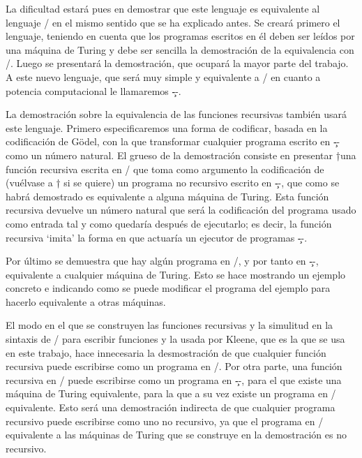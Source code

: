 La dificultad estará pues en demostrar que este lenguaje es equivalente al lenguaje \C/ en el mismo
sentido que se ha explicado antes. Se creará primero el lenguaje, teniendo en cuenta que los
programas escritos en él deben ser leídos por una máquina de Turing y debe ser sencilla la
demostración de la equivalencia con \C/. Luego se presentará la demostración, que ocupará la mayor
parte del trabajo. A este nuevo lenguaje, que será muy simple y equivalente a \C/ en cuanto a potencia
computacional le llamaremos \c--.

La demostración sobre la equivalencia de las funciones recursivas también usará este
lenguaje. Primero especificaremos una forma de codificar, basada en la codificación de Gödel, con la
que transformar cualquier programa escrito en \c-- como un número natural. El grueso de la
demostración consiste en presentar †una función recursiva escrita en \C/ que toma como
argumento la codificación de (vuélvase a † si se quiere) un programa no recursivo escrito en \c--,
que como se habrá demostrado es equivalente a alguna máquina de Turing. Esta función recursiva
devuelve un número natural que será la codificación del programa usa\-do como entrada tal y como
quedaría después de ejecutarlo; es decir, la función recursiva ‘imita’ la forma en que actuaría un
ejecutor de programas \c--.

Por último se demuestra que hay algún programa en \C/, y por tanto en \c--, equivalente a cualquier
máquina de Turing. Esto se hace mostrando un ejemplo concreto e indicando como se puede modificar el
programa del ejemplo para hacerlo equivalente a otras máquinas.

El modo en el que se construyen las funciones recursivas y la simulitud en la sintaxis de \C/ para
escribir funciones y la usada por Kleene, que es la que se usa en este trabajo, hace innecesaria la
desmostración de que cualquier función recursiva puede escribirse como un programa en \C/. Por otra
parte, una función recursiva en \C/ puede escribirse como un programa en \c--, para el que existe una
máquina de Turing equivalente, para la que a su vez existe un programa en \C/ equivalente. Esto será
una demostración indirecta de que cualquier programa recursivo puede escribirse como uno no
recursivo, ya que el programa en \C/ equivalente a las máquinas de Turing que se construye en la
demostración es no recursivo.

